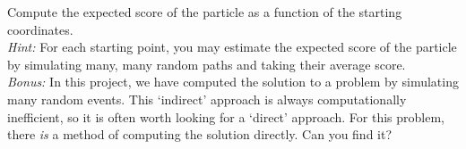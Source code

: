 \noindent Compute the expected score of the particle as a function of the starting coordinates.\\

\noindent \textit{Hint:} For each starting point, you may estimate the expected score of the particle by simulating many, many random paths and taking their average score.\\

\noindent\textit{Bonus:} In this project, we have computed the solution to a problem by simulating many random events. This `indirect' approach is always computationally inefficient, so it is often worth looking for a `direct' approach. For this problem, there \textit{is} a method of computing the solution directly. Can you find it?

